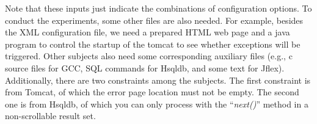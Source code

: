 \documentclass[10pt,journal,compsoc]{IEEEtran}
\begin{document}
Note that these inputs just indicate the combinations of configuration options. To conduct the experiments, some other files are also needed. For example, besides the XML configuration file, we need a prepared HTML web page and a java program to control the startup of the tomcat to see whether exceptions will be triggered. Other subjects also need some corresponding auxiliary files (e.g., c source files for GCC, SQL commands for Hsqldb, and some text for Jflex). Additionally, there are two constraints among the subjects. The first constraint is from Tomcat, of which the error page location must not be empty. The second one is from Hsqldb, of which you can only process with the ``\emph{next()}'' method in a non-scrollable result set.
%



%
%
%
%
\end{document}
